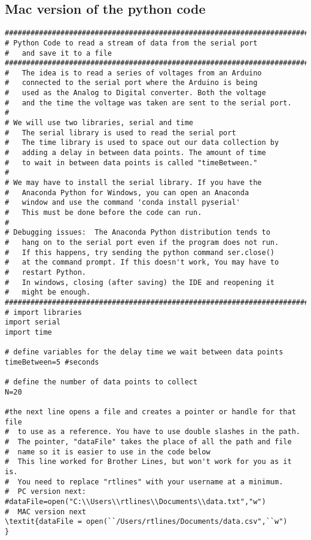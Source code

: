 \subsection{Mac version of the python code}
\begin{verbatim}
###############################################################################
# Python Code to read a stream of data from the serial port
#   and save it to a file
###############################################################################
#   The idea is to read a series of voltages from an Arduino 
#   connected to the serial port where the Arduino is being 
#   used as the Analog to Digital converter. Both the voltage
#   and the time the voltage was taken are sent to the serial port.
#
# We will use two libraries, serial and time
#   The serial library is used to read the serial port
#   The time library is used to space out our data collection by
#   adding a delay in between data points. The amount of time 
#   to wait in between data points is called "timeBetween." 
#
# We may have to install the serial library. If you have the
#   Anaconda Python for Windows, you can open an Anaconda 
#   window and use the command 'conda install pyserial'
#   This must be done before the code can run.
#
# Debugging issues:  The Anaconda Python distribution tends to 
#   hang on to the serial port even if the program does not run. 
#   If this happens, try sending the python command ser.close()
#   at the command prompt. If this doesn't work, You may have to 
#   restart Python.
#   In windows, closing (after saving) the IDE and reopening it 
#   might be enough.
###############################################################################
# import libraries
import serial
import time
 
# define variables for the delay time we wait between data points
timeBetween=5 #seconds
 
# define the number of data points to collect
N=20
 
#the next line opens a file and creates a pointer or handle for that file
#  to use as a reference. You have to use double slashes in the path.
#  The pointer, "dataFile" takes the place of all the path and file
#  name so it is easier to use in the code below
#  This line worked for Brother Lines, but won't work for you as it is.
#  You need to replace "rtlines" with your username at a minimum.
#  PC version next:
#dataFile=open("C:\\Users\\rtlines\\Documents\\data.txt","w")
#  MAC version next
\textit{dataFile = open(``/Users/rtlines/Documents/data.csv",``w")
}
 

\end{verbatim}
